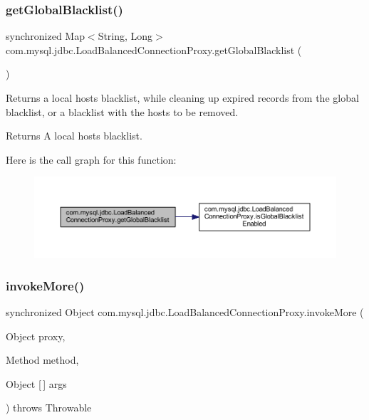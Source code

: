 \subsubsection{\texorpdfstring{get\+Global\+Blacklist()}{getGlobalBlacklist()}}
{\footnotesize\ttfamily synchronized Map$<$String, Long$>$ com.\+mysql.\+jdbc.\+Load\+Balanced\+Connection\+Proxy.\+get\+Global\+Blacklist (\begin{DoxyParamCaption}{ }\end{DoxyParamCaption})}

Returns a local hosts blacklist, while cleaning up expired records from the global blacklist, or a blacklist with the hosts to be removed.

\begin{DoxyReturn}{Returns}
A local hosts blacklist. 
\end{DoxyReturn}
Here is the call graph for this function\+:
\nopagebreak
\begin{figure}[H]
\begin{center}
\leavevmode
\includegraphics[width=350pt]{classcom_1_1mysql_1_1jdbc_1_1_load_balanced_connection_proxy_a409f26f6bf39d9504c4d5c701a01c337_cgraph}
\end{center}
\end{figure}
\mbox{\label{classcom_1_1mysql_1_1jdbc_1_1_load_balanced_connection_proxy_ae2cd16fd57c22bbaf99664f34f67d8fc}} 
\subsubsection{\texorpdfstring{invoke\+More()}{invokeMore()}}
{\footnotesize\ttfamily synchronized Object com.\+mysql.\+jdbc.\+Load\+Balanced\+Connection\+Proxy.\+invoke\+More (\begin{DoxyParamCaption}\item[{Object}]{proxy,  }\item[{Method}]{method,  }\item[{Object \mbox{[}$\,$\mbox{]}}]{args }\end{DoxyParamCaption}) throws Throwable}

